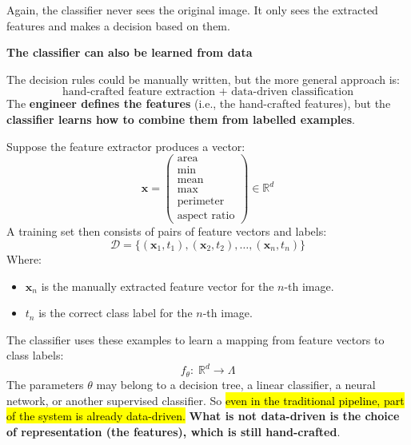\begin{examplebox}
\begin{center}
\begin{tikzpicture}
        \end{tikzpicture}
        \label{fig:decision-tree-apple-orange}
    \end{center}
    Again, the classifier never sees the original image. It only sees the extracted features and makes a decision based on them.
\end{examplebox}

\highspace
\begin{flushleft}
    \textcolor{Green3}{ \textbf{The classifier can also be learned from data}}
\end{flushleft}
The decision rules could be manually written, but the more general approach is:
\begin{equation*}
    \text{hand-crafted feature extraction } + \text{ data-driven classification}
\end{equation*}
The \textbf{engineer defines the features} (i.e., the hand-crafted features), but the \textbf{classifier learns how to combine them from labelled examples}.

\highspace
Suppose the feature extractor produces a vector:
\begin{equation*}
    \mathbf{x} = \begin{pmatrix}
        \text{area} \\
        \text{min} \\
        \text{mean} \\
        \text{max} \\
        \text{perimeter} \\
        \text{aspect ratio}
    \end{pmatrix} \in \mathbb{R}^{d}
\end{equation*}
A training set then consists of pairs of feature vectors and labels:
\begin{equation*}
    \mathcal{D} = \{(\mathbf{x}_1, t_1), (\mathbf{x}_2, t_2), \ldots, (\mathbf{x}_n, t_n)\}
\end{equation*}
Where:
\begin{itemize}
    \item $\mathbf{x}_n$ is the manually extracted feature vector for the $n$-th image.
    \item $t_n$ is the correct class label for the $n$-th image.
\end{itemize}
The classifier uses these examples to learn a mapping from feature vectors to class labels:
\begin{equation*}
    f_{\theta}: \; \mathbb{R}^{d} \to \Lambda
\end{equation*}
The parameters $\theta$ may belong to a decision tree, a linear classifier, a neural network, or another supervised classifier. So \hl{even in the traditional pipeline, part of the system is already data-driven.} \textbf{What is not data-driven is the choice of representation (the features), which is still hand-crafted}.


